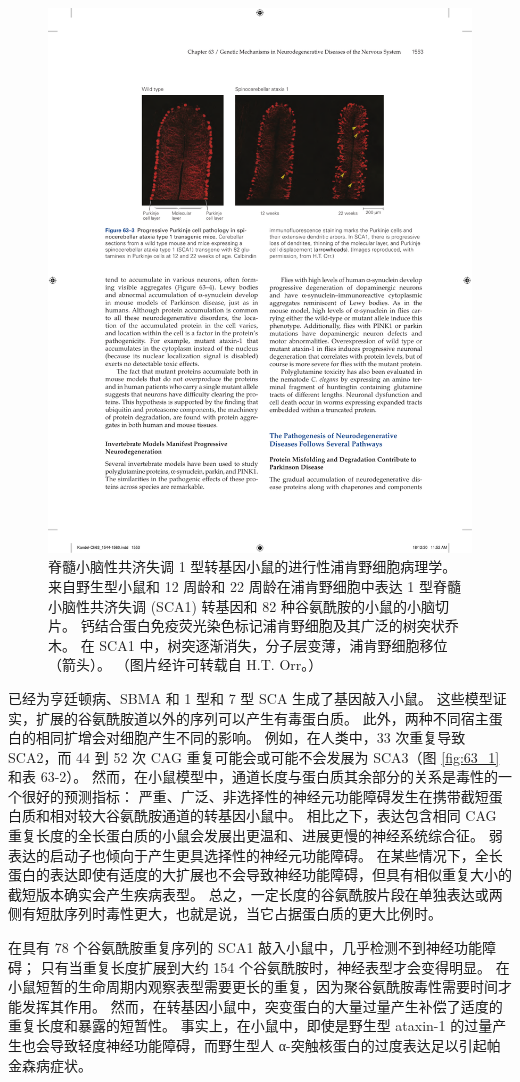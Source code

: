 \begin{figure}[htbp]
	\centering
	\includegraphics[width=0.7\linewidth]{chap63/fig_63_3}
	\caption{脊髓小脑性共济失调 1 型转基因小鼠的进行性浦肯野细胞病理学。 来自野生型小鼠和 12 周龄和 22 周龄在浦肯野细胞中表达 1 型脊髓小脑性共济失调 (SCA1) 转基因和 82 种谷氨酰胺的小鼠的小脑切片。 钙结合蛋白免疫荧光染色标记浦肯野细胞及其广泛的树突状乔木。 在 SCA1 中，树突逐渐消失，分子层变薄，浦肯野细胞移位（箭头）。 （图片经许可转载自 H.T. Orr。）}
	\label{fig:63_3}
\end{figure}


已经为亨廷顿病、SBMA 和 1 型和 7 型 SCA 生成了基因敲入小鼠。
这些模型证实，扩展的谷氨酰胺道以外的序列可以产生有毒蛋白质。
此外，两种不同宿主蛋白的相同扩增会对细胞产生不同的影响。
例如，在人类中，33 次重复导致 SCA2，而 44 到 52 次 CAG 重复可能会或可能不会发展为 SCA3（图 \ref{fig:63_1} 和表 63-2）。
然而，在小鼠模型中，通道长度与蛋白质其余部分的关系是毒性的一个很好的预测指标：
严重、广泛、非选择性的神经元功能障碍发生在携带截短蛋白质和相对较大谷氨酰胺通道的转基因小鼠中。
相比之下，表达包含相同 CAG 重复长度的全长蛋白质的小鼠会发展出更温和、进展更慢的神经系统综合征。
弱表达的启动子也倾向于产生更具选择性的神经元功能障碍。
在某些情况下，全长蛋白的表达即使有适度的大扩展也不会导致神经功能障碍，但具有相似重复大小的截短版本确实会产生疾病表型。
总之，一定长度的谷氨酰胺片段在单独表达或两侧有短肽序列时毒性更大，也就是说，当它占据蛋白质的更大比例时。


在具有 78 个谷氨酰胺重复序列的 SCA1 敲入小鼠中，几乎检测不到神经功能障碍；
只有当重复长度扩展到大约 154 个谷氨酰胺时，神经表型才会变得明显。
在小鼠短暂的生命周期内观察表型需要更长的重复，因为聚谷氨酰胺毒性需要时间才能发挥其作用。
然而，在转基因小鼠中，突变蛋白的大量过量产生补偿了适度的重复长度和暴露的短暂性。
事实上，在小鼠中，即使是野生型 ataxin-1 的过量产生也会导致轻度神经功能障碍，而野生型人 α-突触核蛋白的过度表达足以引起帕金森病症状。


